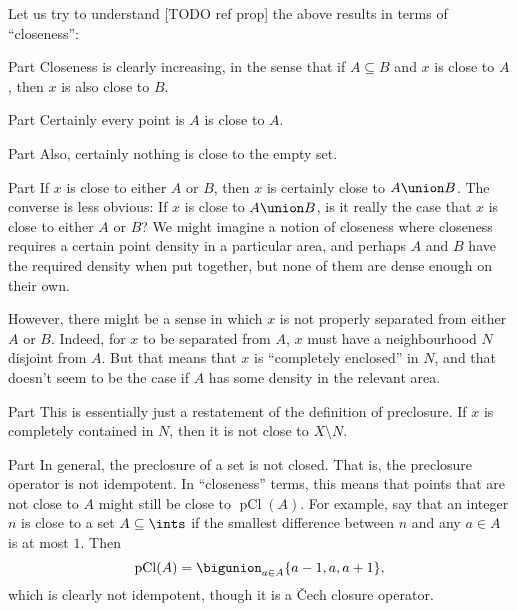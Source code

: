 \documentclass[article, a4paper, 11pt, oneside]{memoir}
\numberwithin{equation}{chapter}
\newcommand{\pCl}[1]{\operatorname{pCl}(#1)}
\begin{document}
Let us try to understand [TODO ref prop] the above results in terms of \enquote{closeness}:
%
\begin{proofsec}
    \item[Part \subcref{enum:preclosure-increasing}]
    Closeness is clearly increasing, in the sense that if $A \subseteq B$ and $x$ is close to $A$, then $x$ is also close to $B$.
    
    \item[Part \subcref{enum:preclosure-extensive}]
    Certainly every point is $A$ is close to $A$.

    \item[Part \subcref{enum:preclosure-nullary-unions}]
    Also, certainly nothing is close to the empty set.

    \item[Part \subcref{enum:preclosure-binary-unions}]
    If $x$ is close to either $A$ or $B$, then $x$ is certainly close to $A \union B$. The converse is less obvious: If $x$ is close to $A \union B$, is it really the case that $x$ is close to either $A$ or $B$? We might imagine a notion of closeness where closeness requires a certain point density in a particular area, and perhaps $A$ and $B$ have the required density when put together, but none of them are dense enough on their own.

    However, there might be a sense in which $x$ is not properly separated from either $A$ or $B$. Indeed, for $x$ to be separated from $A$, $x$ must have a neighbourhood $N$ disjoint from $A$. But that means that $x$ is \enquote{completely enclosed} in $N$, and that doesn't seem to be the case if $A$ has some density in the relevant area.
    
    \item[Part \subcref{enum:preclosure-characterisation-of-nhoods}]
    This is essentially just a restatement of the definition of preclosure. If $x$ is completely contained in $N$, then it is not close to $X \setminus N$.

    \item[Part \subcref{enum:preclosure-inclusion-series}]
    In general, the preclosure of a set is not closed. That is, the preclosure operator is not idempotent. In \enquote{closeness} terms, this means that points that are not close to $A$ might still be close to $\pCl{A}$. For example, say that an integer $n$ is close to a set $A \subseteq \ints$ if the smallest difference between $n$ and any $a \in A$ is at most $1$. Then
    \begin{equation*}
        \pCl{A}
            = \bigunion_{a \in A} \{a-1, a, a+1\},
    \end{equation*}
    which is clearly not idempotent, though it is a \v{C}ech closure operator.


\end{proofsec}
\end{document}
